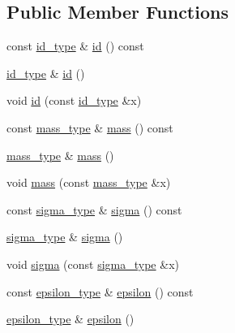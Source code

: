 \subsection*{Public Member Functions}
\begin{DoxyCompactItemize}
\item 
const \hyperlink{classparticletype__t_af4592f0136ed3224434007bc7f5c7fd4}{id\+\_\+type} \& \hyperlink{classparticletype__t_a17881ffeb3dd93830d1b33df6e17598a}{id} () const 
\item 
\hyperlink{classparticletype__t_af4592f0136ed3224434007bc7f5c7fd4}{id\+\_\+type} \& \hyperlink{classparticletype__t_acde6cba736f743c849306febf483e545}{id} ()
\item 
void \hyperlink{classparticletype__t_a4ecb8378ecc012687da000750fdb8d5c}{id} (const \hyperlink{classparticletype__t_af4592f0136ed3224434007bc7f5c7fd4}{id\+\_\+type} \&x)
\item 
const \hyperlink{classparticletype__t_a7ebd18e57b545977bf3d1573ffa395f7}{mass\+\_\+type} \& \hyperlink{classparticletype__t_a7b233c4a0330ede6dcdfb8ddeeebb9e0}{mass} () const 
\item 
\hyperlink{classparticletype__t_a7ebd18e57b545977bf3d1573ffa395f7}{mass\+\_\+type} \& \hyperlink{classparticletype__t_a4adcf91cc5576fd01523b709bb402ffa}{mass} ()
\item 
void \hyperlink{classparticletype__t_ab753b2e5c12a142f8b4cc07dabeaffcd}{mass} (const \hyperlink{classparticletype__t_a7ebd18e57b545977bf3d1573ffa395f7}{mass\+\_\+type} \&x)
\item 
const \hyperlink{classparticletype__t_abbac1ed447872eb2db5cc90f2c1e1a6c}{sigma\+\_\+type} \& \hyperlink{classparticletype__t_aa9189c46367b6c479fc70af923fe854b}{sigma} () const 
\item 
\hyperlink{classparticletype__t_abbac1ed447872eb2db5cc90f2c1e1a6c}{sigma\+\_\+type} \& \hyperlink{classparticletype__t_a399c3fbc49476267096288e440b3ab8b}{sigma} ()
\item 
void \hyperlink{classparticletype__t_a9d6b1333dc57e251dcb18056e7ec50b5}{sigma} (const \hyperlink{classparticletype__t_abbac1ed447872eb2db5cc90f2c1e1a6c}{sigma\+\_\+type} \&x)
\item 
const \hyperlink{classparticletype__t_a94692265645066b820b0e4c308c1566f}{epsilon\+\_\+type} \& \hyperlink{classparticletype__t_a59a6eafceba5dfb7628544e655a75878}{epsilon} () const 
\item 
\hyperlink{classparticletype__t_a94692265645066b820b0e4c308c1566f}{epsilon\+\_\+type} \& \hyperlink{classparticletype__t_ae8bc5195d983bacb82dd04f96f14097c}{epsilon} ()

\end{DoxyCompactItemize}
